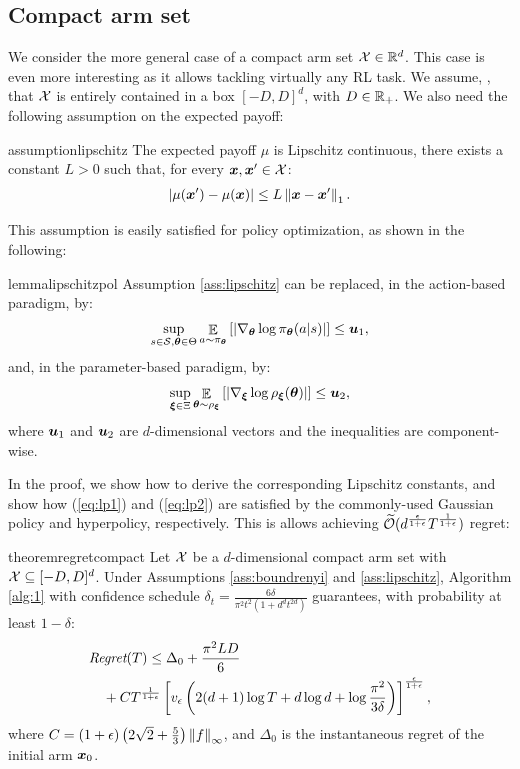 \documentclass{article}
\begin{document}
\subsection{Compact arm set}
We consider the more general case of a compact arm set $\Xspace\in\Reals^d$. This case is even more interesting as it allows tackling virtually any RL task. We assume, \wlg, that $\Xspace$ is entirely contained in a box $[-D,D]^d$, with $D\in\Reals_{+}$. We also need the following assumption on the expected payoff:
%
\begin{restatable}{assumption}{lipschitz}\label{ass:lipschitz}
	The expected payoff $\mu$ is Lipschitz continuous, \ie there exists a constant $L>0$ such that, for every $\vx, \vx'\in\Xspace$:
	\begin{align*}
		|\mu(\vx') - \mu(\vx)| \leq L\norm[1]{\vx - \vx'}.
	\end{align*}
\end{restatable}
%
This assumption is easily satisfied for policy optimization, as shown in the following:
%
\begin{restatable}{lemma}{lipschitzpol}\label{lem:lispschitzpol}
	Assumption \ref{ass:lipschitz} can be replaced, in the action-based paradigm, by:
	\begin{align}\label{eq:lp1}
		\sup_{s\in\Sspace,\vtheta\in\Theta}\Exp_{a\sim\pi_{\vtheta}}
		\left[\left|\nabla_{\vtheta}\log\pi_{\vtheta}(a|s)\right|\right] \leq \vu_1,
	\end{align}
	and, in the parameter-based paradigm, by:
	\begin{align}\label{eq:lp2}
		\sup_{\vxi\in\Xi}\Exp_{\vtheta\sim\rho_{\vxi}}
		\left[\left|\nabla_{\vxi}\log\rho_{\vxi}(\vtheta)\right|\right] \leq \vu_2,
	\end{align}
	where $\vu_1$ and $\vu_2$ are $d$-dimensional vectors and the inequalities are component-wise.
\end{restatable}
%
In the proof, we show how to derive the corresponding Lipschitz constants, and show how (\ref{eq:lp1}) and (\ref{eq:lp2}) are satisfied by the commonly-used Gaussian policy and hyperpolicy, respectively. This is allows achieving $\wt{\mathcal{O}}(d^{\frac{\epsilon}{1+\epsilon}}T^{\frac{1}{1+\epsilon}})$ regret:
%
\begin{restatable}{theorem}{regretcompact}\label{th:regretcompact}
	Let $\Xspace$ be a $d$-dimensional compact arm set with $\Xspace \subseteq [-D,D]^d$. Under Assumptions \ref{ass:boundrenyi} and \ref{ass:lipschitz}, Algorithm \ref{alg:1} with confidence schedule $\delta_t = \frac{6\delta}{\pi^2t^2(1+d^dt^{2d})}$ guarantees, with probability at least $1-\delta$:
	\begin{align*}
	&\Reg(T) \leq \Delta_0 + \frac{\pi^2LD}{6} \\
	&\quad+ 	C
	T^{\frac{1}{1+\epsilon}}
	\left[v_{\epsilon}
	\left(2(d+1)\log T + d\log d + \log \frac{\pi^2}{3\delta}\right)
	\right]^{\frac{\epsilon}{1+\epsilon}},
	\end{align*}
	where $C=(1+\epsilon)\left(2\sqrt{2}+\frac{5}{3}\right)\norm[\infty]{f}$, and $\Delta_0$ is the instantaneous regret of the initial arm $\vx_0$.
\end{restatable}
\end{document}
